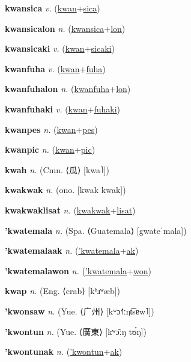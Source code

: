 \textbf{\hypertarget{kwansica}{kwansica}} \textit{v.} (\hyperlink{kwan}{kwan}+\allowbreak \hyperlink{sica}{sica})


\textbf{\hypertarget{kwansicalon}{kwansicalon}} \textit{n.} (\hyperlink{kwansica}{kwansica}+\allowbreak \hyperlink{lon}{lon})


\textbf{\hypertarget{kwansicaki}{kwansicaki}} \textit{v.} (\hyperlink{kwan}{kwan}+\allowbreak \hyperlink{sicaki}{sicaki})


\textbf{\hypertarget{kwanfuha}{kwanfuha}} \textit{v.} (\hyperlink{kwan}{kwan}+\allowbreak \hyperlink{fuha}{fuha})


\textbf{\hypertarget{kwanfuhalon}{kwanfuhalon}} \textit{n.} (\hyperlink{kwanfuha}{kwanfuha}+\allowbreak \hyperlink{lon}{lon})


\textbf{\hypertarget{kwanfuhaki}{kwanfuhaki}} \textit{v.} (\hyperlink{kwan}{kwan}+\allowbreak \hyperlink{fuhaki}{fuhaki})


\textbf{\hypertarget{kwanpes}{kwanpes}} \textit{n.} (\hyperlink{kwan}{kwan}+\allowbreak \hyperlink{pes}{pes})


\textbf{\hypertarget{kwanpic}{kwanpic}} \textit{n.} (\hyperlink{kwan}{kwan}+\allowbreak \hyperlink{pic}{pic})


\textbf{\hypertarget{kwah}{kwah}} \textit{n.} (Cmn. ⟨{\chinese{}瓜}⟩ [kwa˥])


\textbf{\hypertarget{kwakwak}{kwakwak}} \textit{n.} (ono. [kwak kwak])


\textbf{\hypertarget{kwakwaklisat}{kwakwaklisat}} \textit{n.} (\hyperlink{kwakwak}{kwakwak}+\allowbreak \hyperlink{lisat}{lisat})


\textbf{\hypertarget{'kwatemala}{'kwatemala}} \textit{n.} (Spa. ⟨Guatemala⟩ [gwateˈmala])


\textbf{\hypertarget{'kwatemalaak}{'kwatemalaak}} \textit{n.} (\hyperlink{'kwatemala}{'kwatemala}+\allowbreak \hyperlink{ak}{ak})


\textbf{\hypertarget{'kwatemalawon}{'kwatemalawon}} \textit{n.} (\hyperlink{'kwatemala}{'kwatemala}+\allowbreak \hyperlink{won}{won})


\textbf{\hypertarget{kwap}{kwap}} \textit{n.} (Eng. ⟨crab⟩ [kʰɹʷæb])


\textbf{\hypertarget{'kwonsaw}{'kwonsaw}} \textit{n.} (Yue. ⟨{\chinese{}广州}⟩ [kʷɔ˧˥ːŋt͡sɐw˥])


\textbf{\hypertarget{'kwontun}{'kwontun}} \textit{n.} (Yue. ⟨{\chinese{}廣東}⟩ [kʷɔ̌ːŋ tʊ́ŋ])


\textbf{\hypertarget{'kwontunak}{'kwontunak}} \textit{n.} (\hyperlink{'kwontun}{'kwontun}+\allowbreak \hyperlink{ak}{ak})


